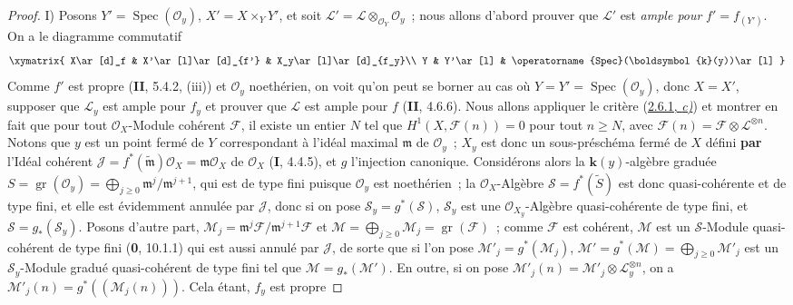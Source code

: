 \begin{proof}
\noindent I) Posons
$Y'=\operatorname{Spec}(\mathcal O_y)$, $X'=X\times_YY'$, et soit
$\mathcal L'=\mathcal L\otimes_{\mathcal O_Y}\mathcal O_y$~;
nous allons d'abord prouver que $\mathcal L'$ est \emph{ample pour}
$f'=f_{(Y')}$. On a le diagramme commutatif
\[
\xymatrix{
X\ar[d]_f & X'\ar[l]\ar[d]_{f'} & X_y\ar[l]\ar[d]_{f_y}\\
Y & Y'\ar[l] & \operatorname{Spec}(\boldsymbol{k}(y))\ar[l]
}
\]
Comme $f'$ est propre (\textbf{II}, 5.4.2, (iii)) et $\mathcal O_y$ noethérien, on
voit qu'on peut se borner au cas où
$Y=Y'=\operatorname{Spec}(\mathcal O_y)$, donc $X=X'$, supposer que
$\mathcal L_y$ est ample pour $f_y$ et prouver que $\mathcal L$ est ample
pour $f$ (\textbf{II}, 4.6.6). Nous allons appliquer le critère
(\hyperref[III.2.6.1-fr]{2.6.1, \emph{c)}}) et montrer en fait que pour tout
$\mathcal O_X$-Module cohérent $\mathcal F$, il existe un entier $N$ tel que
$H^1(X,\mathcal F(n))=0$ pour tout $n\geq N$, avec
$\mathcal F(n)=\mathcal F\otimes\mathcal L^{\otimes n}$.
Notons que $y$ est un point fermé de $Y$ correspondant à l'idéal maximal
$\mathfrak m$ de $\mathcal O_y$~; $X_y$ est donc un sous-préschéma fermé de
$X$ défini \textbf{par} l'Idéal cohérent
$\mathcal J=f^*(\widetilde{\mathfrak m})\mathcal O_X=
\mathfrak m\mathcal O_X$ de $\mathcal O_X$ (\textbf{I}, 4.4.5), et $g$ l'injection
canonique. Considérons alors la $\boldsymbol{k}(y)$-algèbre graduée
$S=\operatorname{gr}(\mathcal O_y)
=\bigoplus_{j\geq0}\mathfrak m^j/\mathfrak m^{j+1}$,
qui est de type fini puisque $\mathcal O_y$ est noethérien~; la
$\mathcal O_X$-Algèbre $\mathcal S=f^*(\widetilde S)$ est donc
quasi-cohérente et de type fini, et elle est évidemment annulée par
$\mathcal J$, donc si on pose $\mathcal S_y=g^*(\mathcal S)$,
$\mathcal S_y$ est une $\mathcal O_{X_y}$-Algèbre quasi-cohérente de type
fini, et $\mathcal S=g_*(\mathcal S_y)$. Posons d'autre part,
$\mathcal M_j=\mathfrak m^j\mathcal F/\mathfrak m^{j+1}\mathcal F$ et
$\mathcal M=\bigoplus_{j\geq0}\mathcal M_j
=\operatorname{gr}(\mathcal F)$~;
comme $\mathcal F$ est cohérent, $\mathcal M$ est un $\mathcal S$-Module
quasi-cohérent de type fini (\textbf{0}, 10.1.1) qui est aussi annulé par
$\mathcal J$, de sorte que si l'on pose
$\mathcal M'_j=g^*(\mathcal M_j)$, $\mathcal M'=g^*(\mathcal M)=\bigoplus_{j\geq0}\mathcal M'_j$
est un $\mathcal S_y$-Module gradué quasi-cohérent de type
fini tel que $\mathcal M=g_*(\mathcal M')$. En outre, si on pose
$\mathcal M'_j(n)=\mathcal M'_j\otimes\mathcal L_y^{\otimes n}$, on a
$\mathcal M'_j(n)=g^*((\mathcal M_j(n)))$. Cela étant, $f_y$ est propre

\end{proof}
